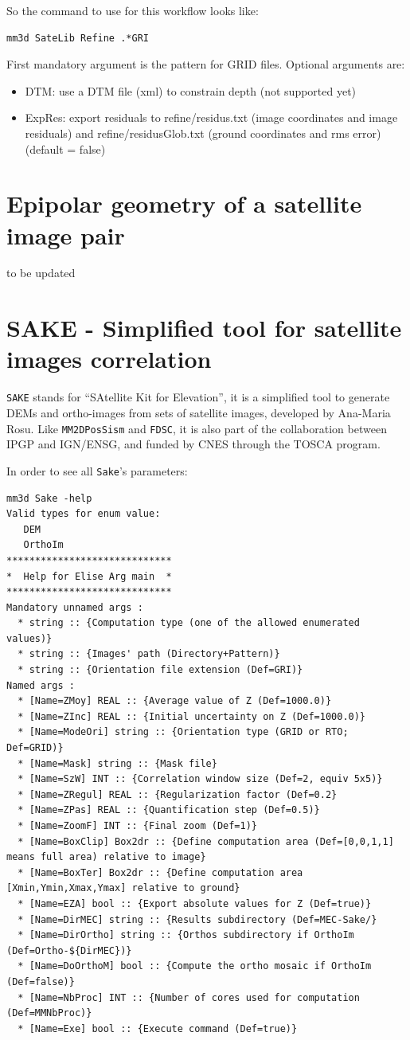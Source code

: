 So the command to use for this workflow looks like:
\begin{verbatim}
mm3d SateLib Refine .*GRI
\end{verbatim}

First mandatory argument is the pattern for GRID files. Optional arguments are:
\begin{itemize}
\item DTM: use a DTM file (xml) to constrain depth (not supported yet)
\item ExpRes: export residuals to refine/residus.txt (image coordinates and image residuals) and refine/residusGlob.txt (ground coordinates and rms error) (default = false)
\end{itemize}

%
\section{Epipolar geometry of a satellite image pair}\label{sec:epiSatel}
to be updated
%
\section{SAKE - Simplified tool for satellite images correlation}\label{sec:sake}

{\tt SAKE} stands for ``SAtellite Kit for Elevation'', it is a simplified tool to generate DEMs and ortho-images from sets of satellite images, developed by Ana-Maria Rosu. Like {\tt MM2DPosSism} and {\tt FDSC}, it is also part of the collaboration between IPGP and IGN/ENSG, and funded by CNES through the TOSCA program.

\vspace{0.3cm}
In order to see all {\tt Sake}'s parameters:
\begin{verbatim}
mm3d Sake -help
Valid types for enum value:
   DEM
   OrthoIm
*****************************
*  Help for Elise Arg main  *
*****************************
Mandatory unnamed args :
  * string :: {Computation type (one of the allowed enumerated values)}
  * string :: {Images' path (Directory+Pattern)}
  * string :: {Orientation file extension (Def=GRI)}
Named args :
  * [Name=ZMoy] REAL :: {Average value of Z (Def=1000.0)}
  * [Name=ZInc] REAL :: {Initial uncertainty on Z (Def=1000.0)}
  * [Name=ModeOri] string :: {Orientation type (GRID or RTO; Def=GRID)}
  * [Name=Mask] string :: {Mask file}
  * [Name=SzW] INT :: {Correlation window size (Def=2, equiv 5x5)}
  * [Name=ZRegul] REAL :: {Regularization factor (Def=0.2}
  * [Name=ZPas] REAL :: {Quantification step (Def=0.5)}
  * [Name=ZoomF] INT :: {Final zoom (Def=1)}
  * [Name=BoxClip] Box2dr :: {Define computation area (Def=[0,0,1,1] means full area) relative to image}
  * [Name=BoxTer] Box2dr :: {Define computation area [Xmin,Ymin,Xmax,Ymax] relative to ground}
  * [Name=EZA] bool :: {Export absolute values for Z (Def=true)}
  * [Name=DirMEC] string :: {Results subdirectory (Def=MEC-Sake/}
  * [Name=DirOrtho] string :: {Orthos subdirectory if OrthoIm (Def=Ortho-${DirMEC})}
  * [Name=DoOrthoM] bool :: {Compute the ortho mosaic if OrthoIm (Def=false)}
  * [Name=NbProc] INT :: {Number of cores used for computation (Def=MMNbProc)}
  * [Name=Exe] bool :: {Execute command (Def=true)}
\end{verbatim}

